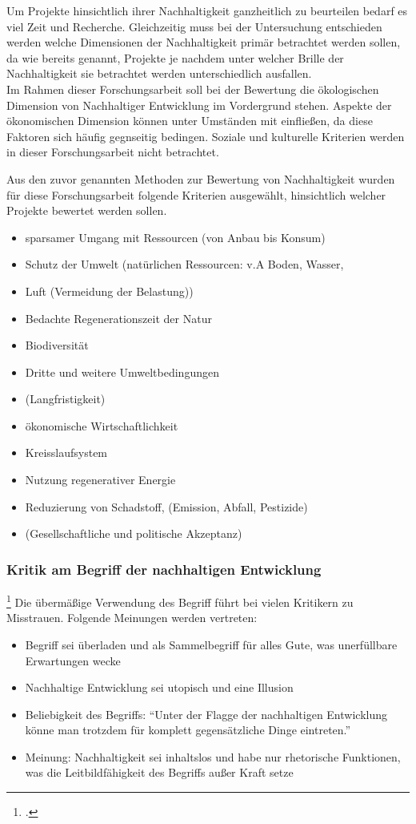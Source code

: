 \documentclass{scrartcl}
\begin{document}
Um Projekte hinsichtlich ihrer Nachhaltigkeit ganzheitlich zu beurteilen bedarf es viel Zeit und Recherche. Gleichzeitig muss bei der Untersuchung entschieden werden welche Dimensionen der Nachhaltigkeit primär betrachtet werden sollen, da wie bereits genannt, Projekte je nachdem unter welcher Brille der Nachhaltigkeit sie betrachtet werden unterschiedlich ausfallen.
\\
Im Rahmen dieser Forschungsarbeit soll bei der Bewertung die ökologischen Dimension von Nachhaltiger Entwicklung im Vordergrund stehen. Aspekte der ökonomischen Dimension können unter Umständen mit einfließen, da diese Faktoren sich häufig gegnseitig bedingen. Soziale und kulturelle Kriterien werden in dieser Forschungsarbeit nicht betrachtet.

Aus den zuvor genannten Methoden zur Bewertung von Nachhaltigkeit wurden für diese Forschungsarbeit folgende Kriterien ausgewählt, hinsichtlich welcher Projekte bewertet werden sollen.

\begin{itemize}
\item sparsamer Umgang mit Ressourcen (von Anbau bis Konsum)
\item Schutz der Umwelt (natürlichen Ressourcen: v.A Boden, Wasser, \item Luft (Vermeidung der Belastung))
\item Bedachte Regenerationszeit der Natur
\item Biodiversität
\item Dritte und weitere Umweltbedingungen
\item (Langfristigkeit)
\item ökonomische Wirtschaftlichkeit
\item Kreisslaufsystem
\item Nutzung regenerativer Energie
\item Reduzierung von Schadstoff, (Emission, Abfall, Pestizide)
\item (Gesellschaftliche und politische Akzeptanz)
\end{itemize}

\subsubsection{Kritik am Begriff der nachhaltigen Entwicklung}\footcite{NachhaltigeBrockhaus.de}
Die übermäßige Verwendung des Begriff führt bei vielen Kritikern zu Misstrauen. Folgende Meinungen werden vertreten:

\begin{itemize}
\item Begriff sei überladen und als Sammelbegriff für alles Gute, was unerfüllbare Erwartungen wecke
\item Nachhaltige Entwicklung sei utopisch und eine Illusion
\item Beliebigkeit des Begriffs: “Unter der Flagge der nachhaltigen Entwicklung könne man trotzdem für komplett gegensätzliche Dinge eintreten.”
\item Meinung: Nachhaltigkeit sei inhaltslos und habe nur rhetorische Funktionen, was die Leitbildfähigkeit des Begriffs außer Kraft setze
\end{itemize}
\end{document}
